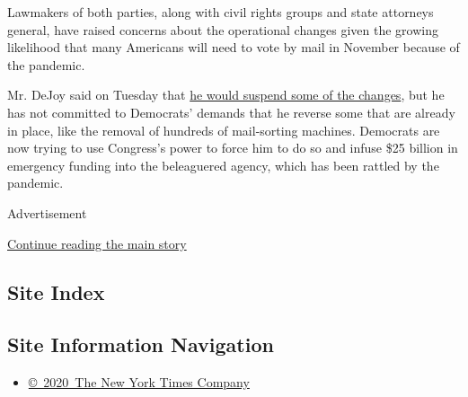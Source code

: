 Lawmakers of both parties, along with civil rights groups and state
attorneys general, have raised concerns about the operational changes
given the growing likelihood that many Americans will need to vote by
mail in November because of the pandemic.

Mr. DeJoy said on Tuesday that
\href{https://www.nytimes3xbfgragh.onion/2020/08/19/business/economy/postal-service-changes-dejoy.html}{he
would suspend some of the changes}, but he has not committed to
Democrats' demands that he reverse some that are already in place, like
the removal of hundreds of mail-sorting machines. Democrats are now
trying to use Congress's power to force him to do so and infuse \$25
billion in emergency funding into the beleaguered agency, which has been
rattled by the pandemic.

Advertisement

\protect\hyperlink{after-bottom}{Continue reading the main story}

\hypertarget{site-index}{%
\subsection{Site Index}\label{site-index}}

\hypertarget{site-information-navigation}{%
\subsection{Site Information
Navigation}\label{site-information-navigation}}

\begin{itemize}
\tightlist
\item
  \href{https://help.nytimes3xbfgragh.onion/hc/en-us/articles/115014792127-Copyright-notice}{©~2020~The
  New York Times Company}
\end{itemize}

